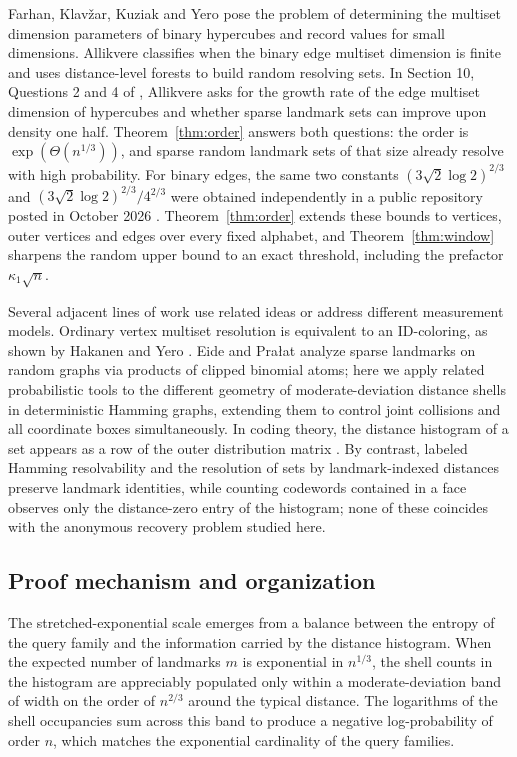 \documentclass[11pt]{article}
\theoremstyle{definition}
\begin{document}
Farhan, Klav\v{z}ar, Kuziak and Yero \cite{FKKY} pose the problem of determining the multiset dimension parameters of binary hypercubes and record values for small dimensions. Allikvere \cite{Allikvere} classifies when the binary edge multiset dimension is finite and uses distance-level forests to build random resolving sets. In Section 10, Questions 2 and 4 of \cite{Allikvere}, Allikvere asks for the growth rate of the edge multiset dimension of hypercubes and whether sparse landmark sets can improve upon density one half. Theorem~\ref{thm:order} answers both questions: the order is \(\exp(\Theta(n^{1/3}))\), and sparse random landmark sets of that size already resolve with high probability. For binary edges, the same two constants \((3\sqrt2\log2)^{2/3}\) and \((3\sqrt2\log2)^{2/3}/4^{2/3}\) were obtained independently in a public repository posted in October 2026 \cite{GH}. Theorem~\ref{thm:order} extends these bounds to vertices, outer vertices and edges over every fixed alphabet, and Theorem~\ref{thm:window} sharpens the random upper bound to an exact threshold, including the prefactor \(\kappa_1\sqrt n\).

Several adjacent lines of work use related ideas or address different measurement models. Ordinary vertex multiset resolution is equivalent to an ID-coloring, as shown by Hakanen and Yero \cite[Theorem 2.1]{ID}. Eide and Pra{\l}at \cite{EP} analyze sparse landmarks on random graphs via products of clipped binomial atoms; here we apply related probabilistic tools to the different geometry of moderate-deviation distance shells in deterministic Hamming graphs, extending them to control joint collisions and all coordinate boxes simultaneously. In coding theory, the distance histogram of a set appears as a row of the outer distribution matrix \cite{CCM}. By contrast, labeled Hamming resolvability \cite{Laird} and the resolution of sets by landmark-indexed distances \cite{Several} preserve landmark identities, while counting codewords contained in a face \cite{Abdurakhmanov} observes only the distance-zero entry of the histogram; none of these coincides with the anonymous recovery problem studied here.

\subsection{Proof mechanism and organization}
The stretched-exponential scale emerges from a balance between the entropy of the query family and the information carried by the distance histogram. When the expected number of landmarks \(m\) is exponential in \(n^{1/3}\), the shell counts in the histogram are appreciably populated only within a moderate-deviation band of width on the order of \(n^{2/3}\) around the typical distance. The logarithms of the shell occupancies sum across this band to produce a negative log-probability of order \(n\), which matches the exponential cardinality of the query families.
\end{document}
